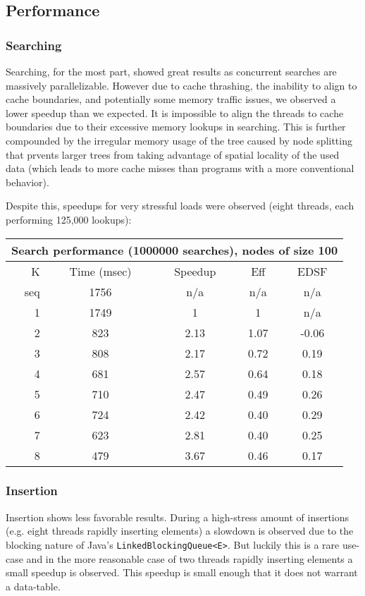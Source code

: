 \documentclass[conference]{IEEEtran}
\begin{document}
\subsection{Performance}
\subsubsection{Searching}
Searching, for the most part, showed great results as concurrent searches
are massively parallelizable. However due to cache thrashing, the inability to
align to cache boundaries, and potentially some memory traffic issues, we 
observed a lower speedup than we expected. It is impossible to align the 
threads to cache boundaries due to their excessive memory lookups in searching. 
This is further compounded by the irregular memory usage of the tree caused by
node splitting that prvents larger trees from taking advantage of spatial 
locality of the used data (which leads to more cache misses than programs with
a more conventional behavior).

Despite this, speedups for very stressful loads were observed (eight threads,
each performing 125,000 lookups):
\begin{center}
\begin{tabular} { | r | c | c | c | c |}
\hline
\multicolumn{5}{|c|}{Search performance (1000000 searches), nodes of size 100}\\\hline\hline
K & Time (msec) & Speedup & Eff & EDSF \\\hline
seq & 1756 & n/a & n/a & n/a \\\hline
1 & 1749 & 1   & 1  & n/a \\\hline
2 & 823 & 2.13 & 1.07  & -0.06 \\\hline
3 & 808 & 2.17 & 0.72 & 0.19 \\\hline
4 & 681 & 2.57 & 0.64 & 0.18 \\\hline
5 & 710 & 2.47 & 0.49 & 0.26 \\\hline
6 & 724 & 2.42 & 0.40 & 0.29 \\\hline
7 & 623 & 2.81 & 0.40 & 0.25 \\\hline
8 & 479 & 3.67 & 0.46 & 0.17 \\\hline
\end{tabular}
\end{center}
\subsubsection{Insertion}
Insertion shows less favorable results. During a high-stress amount of 
insertions (e.g. eight threads rapidly inserting elements) a slowdown is 
observed due to the blocking nature of Java's \texttt{LinkedBlockingQueue<E>}. But
luckily this is a rare use-case and in the more reasonable case of two threads 
rapidly inserting elements a small speedup is observed. This speedup is small 
enough that it does not warrant a data-table.
\end{document}
